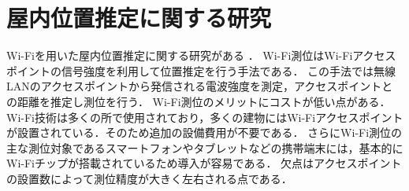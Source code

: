 


\section{屋内位置推定に関する研究}\label{2.1}


Wi-Fiを用いた屋内位置推定に関する研究がある\cite{wifi0} \cite{wifi1}．
Wi-Fi測位はWi-Fiアクセスポイントの信号強度を利用して位置推定を行う手法である．
この手法では無線LANのアクセスポイントから発信される電波強度を測定，アクセスポイントとの距離を推定し測位を行う．
Wi-Fi測位のメリットにコストが低い点がある．Wi-Fi技術は多くの所で使用されており，多くの建物にはWi-Fiアクセスポイントが設置されている．そのため追加の設備費用が不要である．
さらにWi-Fi測位の主な測位対象であるスマートフォンやタブレットなどの携帯端末には，基本的にWi-Fiチップが搭載されているため導入が容易である．
欠点はアクセスポイントの設置数によって測位精度が大きく左右される点である．



